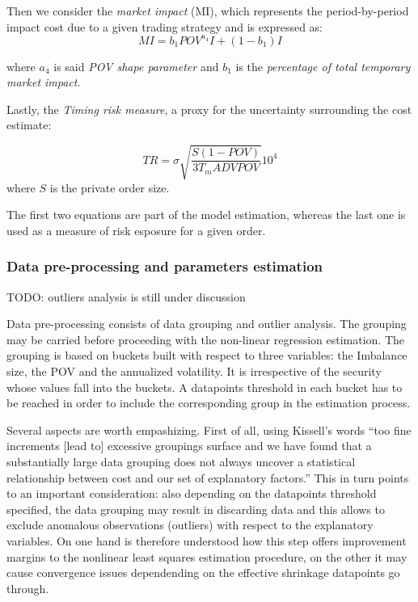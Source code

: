 Then we consider the \emph{market impact} (MI), which represents the
period-by-period impact cost due to a given trading strategy and is
expressed as: \[ MI = b_1 POV^{a_4} I + (1 - b_1) I \]

where \(a_4\) is said \emph{POV shape parameter} and \(b_1\) is the
\emph{percentage of total temporary market impact}.

Lastly, the \emph{Timing risk measure}, a proxy for the uncertainty
surrounding the cost estimate:

\[ TR = \sigma \sqrt{\frac{S (1 - POV)}{3 T_{m} ADV POV}} 10^{4} \]
where \(S\) is the private order size.

The first two equations are part of the model estimation, whereas the
last one is used as a measure of risk esposure for a given order.

\hypertarget{data-pre-processing-and-parameters-estimation}{%
\subsubsection{Data pre-processing and parameters
estimation}\label{data-pre-processing-and-parameters-estimation}}

TODO: outliers analysis is still under discussion

Data pre-processing consists of data grouping and outlier analysis. The
grouping may be carried before proceeding with the non-linear regression
estimation. The grouping is based on buckets built with respect to three
variables: the Imbalance size, the POV and the annualized volatility. It
is irrespective of the security whose values fall into the buckets. A
datapoints threshold in each bucket has to be reached in order to
include the corresponding group in the estimation process.

Several aspects are worth empashizing. First of all, using Kissell's
words ``too fine increments {[}lead to{]} excessive groupings surface
and we have found that a substantially large data grouping does not
always uncover a statistical relationship between cost and our set of
explanatory factors.'' This in turn points to an important
consideration: also depending on the datapoints threshold specified, the
data grouping may result in discarding data and this allows to exclude
anomalous observations (outliers) with respect to the explanatory
variables. On one hand is therefore understood how this step offers
improvement margins to the nonlinear least squares estimation procedure,
on the other it may cause convergence issues dependending on the
effective shrinkage datapoints go through.

